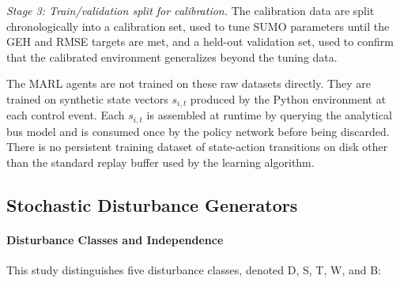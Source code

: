 \textit{Stage 3: Train/validation split for calibration.} The calibration data are split chronologically into a calibration set, used to tune SUMO parameters until the GEH and RMSE targets are met, and a held-out validation set, used to confirm that the calibrated environment generalizes beyond the tuning data.

The MARL agents are not trained on these raw datasets directly. They are trained on synthetic state vectors $s_{i,t}$ produced by the Python environment at each control event. Each $s_{i,t}$ is assembled at runtime by querying the analytical bus model and is consumed once by the policy network before being discarded. There is no persistent training dataset of state-action transitions on disk other than the standard replay buffer used by the learning algorithm.

\subsection{Stochastic Disturbance Generators}
\label{subsec:stochastic-vars}

\paragraph{Disturbance Classes and Independence}

This study distinguishes five disturbance classes, denoted D, S, T, W, and B:


